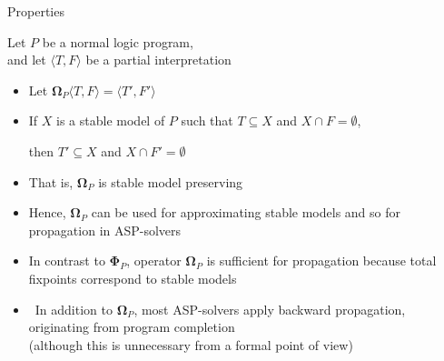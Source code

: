 \begin{frame}{Properties}

  Let $P$ be a normal logic program,\\ and
  let $\langle T,F \rangle$ be a partial interpretation

  \begin{itemize}
  \item<1-> Let ${\mathbf{\Omega}}_P\langle T,F \rangle=\langle T',F'\rangle$
  \item<2-> If $X$ is a stable model of $P$ such that $T\subseteq X$ and $X\cap F=\emptyset$,
    \par then $T'\subseteq X$ and $X\cap F'=\emptyset$
  \item<3-> [] That is, ${\mathbf{\Omega}}_P$ is \alert{stable model preserving}
  \item<3-> [] Hence, ${\mathbf{\Omega}}_P$ can be used for approximating stable models
    and so for propagation in ASP-solvers
    \medskip
  \item <4-> In contrast to ${\mathbf{\Phi}}_P$,
    operator ${\mathbf{\Omega}}_P$ is sufficient for propagation
    because total fixpoints correspond to stable models
    \medskip
  \item<5->  \
    In addition to ${\mathbf{\Omega}}_P$, most ASP-solvers apply backward
    propagation, originating from program completion
    \\
    (although this is unnecessary from a formal point of view)
  \end{itemize}
\end{frame}
%
